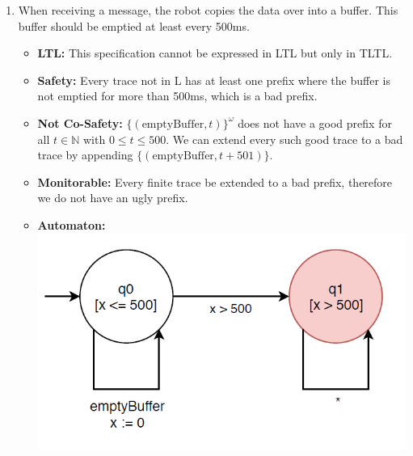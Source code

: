 \documentclass[12pt]{article}
\begin{document}
\begin{enumerate}
\item When receiving a message, the robot copies the data over into a buffer. This buffer should be emptied at least every 500ms.
	\begin{itemize}
		\item \textbf{LTL:} This specification cannot be expressed in LTL but only in TLTL.
		\item \textbf{Safety:} Every trace not in L has at least one prefix where the buffer is not emptied for more than 500ms, which is a bad prefix.
		\item \textbf{Not Co-Safety:} $\{( \text{emptyBuffer}, t)\}^ {\omega}$ does not have a good prefix for all $t \in \mathbb{N}$ with $0 \leq t \leq 500$. We can extend every such good trace to a bad trace by appending $\{( \text{emptyBuffer}, t + 501)\}$.
		\item \textbf{Monitorable:} Every finite trace be extended to a bad prefix, therefore we do not have an ugly prefix.
		\item \textbf{Automaton:} \\
			\includegraphics[scale = 0.5]{images/bufferAutomaton}
	\end{itemize}				

\end{enumerate}
\end{document}
